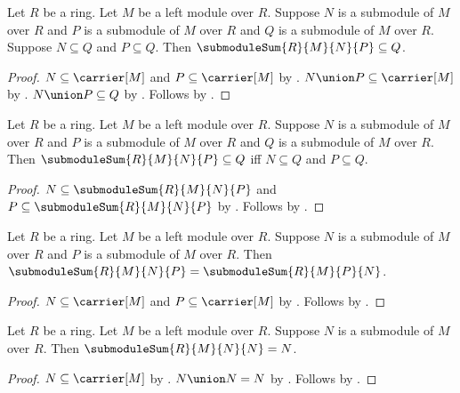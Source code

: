 \begin{theorem}\label{submodule_sum_least}
    Let $R$ be a ring.
    Let $M$ be a left module over $R$.
    Suppose $N$ is a submodule of $M$ over $R$ and
        $P$ is a submodule of $M$ over $R$ and
        $Q$ is a submodule of $M$ over $R$.
    Suppose $N\subseteq Q$ and $P\subseteq Q$.
    Then $\submoduleSum{R}{M}{N}{P}\subseteq Q$.
\end{theorem}
\begin{proof}
    $N\subseteq\carrier[M]$ and $P\subseteq\carrier[M]$ by
        .
    $N\union P\subseteq\carrier[M]$ by
        .
    $N\union P\subseteq Q$ by .
    Follows by .
\end{proof}

\begin{theorem}\label{submodule_sum_universal_property}
    Let $R$ be a ring.
    Let $M$ be a left module over $R$.
    Suppose $N$ is a submodule of $M$ over $R$ and
        $P$ is a submodule of $M$ over $R$ and
        $Q$ is a submodule of $M$ over $R$.
    Then $\submoduleSum{R}{M}{N}{P}\subseteq Q$ iff
        $N\subseteq Q$ and $P\subseteq Q$.
\end{theorem}
\begin{proof}
    $N\subseteq\submoduleSum{R}{M}{N}{P}$ and
        $P\subseteq\submoduleSum{R}{M}{N}{P}$ by
        .
    Follows by .
\end{proof}

\begin{theorem}\label{submodule_sum_commutative}
    Let $R$ be a ring.
    Let $M$ be a left module over $R$.
    Suppose $N$ is a submodule of $M$ over $R$ and
        $P$ is a submodule of $M$ over $R$.
    Then $\submoduleSum{R}{M}{N}{P}=\submoduleSum{R}{M}{P}{N}$.
\end{theorem}
\begin{proof}
    $N\subseteq\carrier[M]$ and $P\subseteq\carrier[M]$ by
        .
    Follows by .
\end{proof}

\begin{theorem}\label{submodule_sum_idempotent}
    Let $R$ be a ring.
    Let $M$ be a left module over $R$.
    Suppose $N$ is a submodule of $M$ over $R$.
    Then $\submoduleSum{R}{M}{N}{N}=N$.
\end{theorem}
\begin{proof}
    $N\subseteq\carrier[M]$ by .
    $N\union N=N$ by .
    Follows by
        .
\end{proof}

